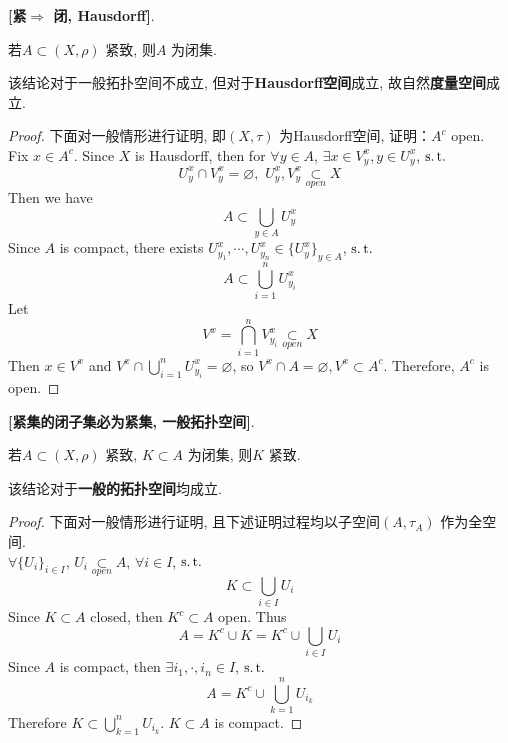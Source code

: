 	\begin{proposition}\label{prop 1.6.1}
		\textbf{[紧$\Rightarrow$ 闭, Hausdorff]}. 
		\begin{center}
			若$A \subset (X , \rho)$ 紧致, 则$A$ 为闭集.
		\end{center}
		
		\vspace{2em}
		
		\begin{rmk}
			该结论对于一般拓扑空间不成立, 但对于\textbf{Hausdorff空间}成立, 故自然\textbf{度量空间}成立.
		\end{rmk}
	
		\vspace{2em}
		
		\begin{proof}
			下面对一般情形进行证明, 即$(X , \tau)$ 为Hausdorff空间, 证明：$A^c$ open. \\
			Fix $x \in A^c$. Since $X$ is Hausdorff, then for $\forall y \in A$, $\exists x \in V_{y}^x , y \in U_{y}^x$, $\operatorname{s.t.}$
			\[ U_{y}^x \cap V_{y}^x = \varnothing , \,\, U_{y}^{x} , V_{y}^x \underset{open}{\subset} X \]
			Then we have
			\[ A \subset \bigcup_{y \in A} U_{y}^x \]
			Since $A$ is compact, there exists $U_{y_1}^x , \cdots , U_{y_n}^x \in \{ U_{y}^x \}_{y \in A}$, $\operatorname{s.t.}$
			\[ A \subset \bigcup_{i = 1}^{n} U_{y_i}^x \]
			Let
			\[ V^x = \bigcap_{i = 1}^{n} V_{y_i}^x \underset{open}{\subset} X \]
			Then $x \in V^x$ and $V^x \cap \bigcup_{i = 1}^{n} U_{y_i}^x = \varnothing$, so $V^x \cap A = \varnothing , V^x \subset A^c$. Therefore, $A^c$ is open.
		\end{proof}
	\end{proposition}

	\newpage
	
	\begin{proposition}\label{prop 1.6.2}
		\textbf{[紧集的闭子集必为紧集, 一般拓扑空间]}. 
		\begin{center}
			若$A \subset (X , \rho)$ 紧致, $K \subset A$ 为闭集, 则$K$ 紧致.
		\end{center}
		
		\begin{rmk}
			该结论对于\textbf{一般的拓扑空间}均成立. 
		\end{rmk}
	
		\vspace{1em}
		
		\begin{proof}
			下面对一般情形进行证明, 且下述证明过程均以子空间$(A , \tau_A)$ 作为全空间. \\
			$\forall \{ U_i \}_{i \in I}$, $U_i \underset{open}{\subset} A$, $\forall i \in I$, $\operatorname{s.t.}$
			\[ K \subset \bigcup_{i \in I}{U_i} \]
			Since $K \subset A$ closed, then $K^c \subset A$ open. Thus
			\[ A = K^c \cup K = K^c \cup \bigcup_{i \in I} U_i \]
			Since $A$ is compact, then $\exists i_1 , \cdot , i_n \in I$, $\operatorname{s.t.}$
			\[ A = K^c \cup \bigcup_{k = 1}^{n} U_{i_k} \]
			Therefore $K \subset \bigcup_{k = 1}^{n} U_{i_k}$. $K \subset A$ is compact.
		\end{proof}
	\end{proposition}
	
